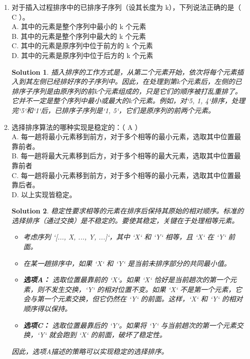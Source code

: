 \documentclass[UTF8]{report}
\newtheorem{solution}{Solution}
\theoremstyle{MyLineTheoremStyle} %
\theoremstyle{MyBlockTheoremStyle} %
\theoremstyle{MySubsubsectionStyle} %
\begin{document}
\begin{enumerate}
    \item 对于插入过程排序中的已排序子序列（设其长度为 k），下列说法正确的是（ C ）。\\
    A. 其中的元素是整个序列中最小的 k 个元素 \\
    B. 其中的元素是整个序列中最大的 k 个元素 \\
    C. 其中的元素是原序列中位于前方的 k 个元素 \\
    D. 其中的元素是原序列中位于后方的 k 个元素
    \begin{solution}
        插入排序的工作方式是，从第二个元素开始，依次将每个元素插入到其左侧已经排好序的子序列中。因此，在处理到第k个元素后，左侧的已排序子序列是由原序列的前k个元素组成的，只是它们的顺序被打乱重排了。它并不一定是整个序列中最小或最大的k个元素。例如，对`{5, 1, 4}`排序，处理完`5`和`1`后，已排序子序列是`{1, 5}`，它们是原序列的前两个元素。
    \end{solution}

    \item 选择排序算法的哪种实现是稳定的：（ A ）\\
    A. 每一趟将最小元素移到前方，对于多个相等的最小元素，选取其中位置最靠前者。\\
    B. 每一趟将最大元素移到后方，对于多个相等的最大元素，选取其中位置最靠前者 \\
    C. 每一趟将最小元素移到前方，对于多个相等的最小元素，选取其中位置最靠后者。\\
    D. 以上实现皆稳定。
    \begin{solution}
        稳定性要求相等的元素在排序后保持其原始的相对顺序。标准的选择排序（通过交换）是不稳定的。要使其稳定，关键在于处理相等元素。
        \begin{itemize}
            \item 考虑序列 `[..., X, ..., Y, ...]`，其中 `X` 和 `Y` 相等，且 `X` 在 `Y` 前面。
            \item 在某一趟排序中，如果 `X` 和 `Y` 是当前未排序部分的共同最小值。
            \item \textbf{选项A：} 选取位置最靠前的 `X`。如果 `X` 恰好是当前趟次的第一个元素，则不发生交换，`Y` 的相对位置不变。如果 `X` 不是第一个元素，它会与第一个元素交换，但它仍然在 `Y` 的前面。这样，`X` 和 `Y` 的相对顺序得以保持。
            \item \textbf{选项C：} 选取位置最靠后的 `Y`。如果将 `Y` 与当前趟次的第一个元素交换，`Y` 就会跑到 `X` 的前面，破坏了稳定性。
        \end{itemize}
        因此，选项A描述的策略可以实现稳定的选择排序。
    \end{solution}


\end{enumerate}
\end{document}

